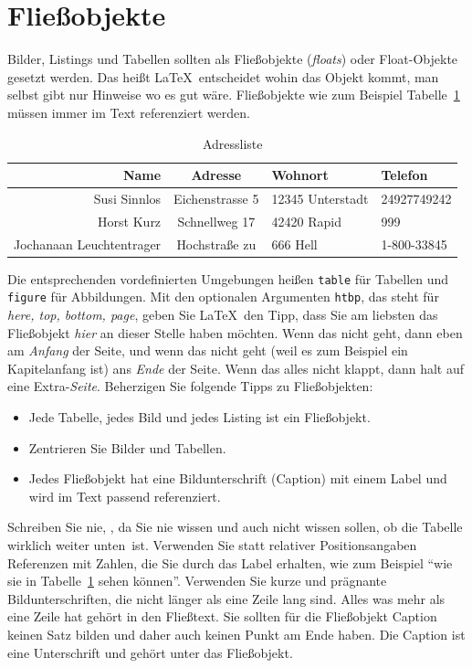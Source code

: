 \documentclass[11pt,a4paper]{report}
\begin{document}
\section{Fließobjekte}

Bilder, Listings und Tabellen sollten als Fließobjekte (\emph{floats}) 
oder Float-Objekte gesetzt werden.
Das heißt \LaTeX\ entscheidet wohin das Objekt kommt, man selbst
gibt nur Hinweise wo es gut wäre.
Fließobjekte wie zum Beispiel Tabelle~\ref{tab:meinetab} müssen immer im 
Text referenziert werden.

\begin{table}[htbp] %
\centering
\begin{tabular}{|r|c|l|l|}
\hline
\textbf{Name} & \textbf{Adresse} & \textbf{Wohnort} & \textbf{Telefon} \\ 
\hline\hline
Susi Sinnlos & Eichenstrasse 5 & 12345 Unterstadt & 24927749242 \\
Horst Kurz & Schnellweg 17 & 42420 Rapid & 999 \\\hline
Jochanaan Leuchtentrager & Hochstraße zu & 666 Hell & 1-800-33845\\\hline
\end{tabular}
\caption{Adressliste}
\label{tab:meinetab}
\end{table}

Die entsprechenden vordefinierten Umgebungen heißen 
\verb|table| für Tabellen und \verb|figure| für Abbildungen. 
Mit den optionalen Argumenten \verb|htbp|, das steht für
\textit{here, top, bottom, page}, geben Sie \LaTeX\ den 
Tipp, dass Sie am liebsten das Fließobjekt \textit{hier}
an dieser Stelle haben möchten. Wenn das nicht geht, dann
eben am \textit{Anfang} der Seite, und wenn das nicht geht (weil es
zum Beispiel ein Kapitelanfang ist) ans \textit{Ende} der Seite. 
Wenn das alles nicht klappt, dann halt auf eine Extra-\textit{Seite}.
Beherzigen Sie folgende Tipps zu Fließobjekten:
\begin{itemize}
\item Jede Tabelle, jedes Bild und jedes Listing ist ein Fließobjekt.
\item Zentrieren Sie Bilder und Tabellen.
\item Jedes Fließobjekt hat eine Bildunterschrift (Caption) mit
  einem Label und wird im Text passend referenziert.
\end{itemize}
Schreiben Sie nie, ,
da Sie nie wissen und auch nicht wissen sollen, ob die Tabelle 
wirklich \glqq weiter unten\grqq\ ist. 
Verwenden Sie statt relativer Positionsangaben Referenzen mit Zahlen,
die Sie durch das Label erhalten, wie zum Beispiel 
"`wie sie in Tabelle~\ref{tab:meinetab} sehen können"'.
Verwenden Sie kurze und prägnante Bildunterschriften, die 
nicht länger als eine Zeile lang sind. 
Alles was mehr als eine Zeile hat gehört in den Fließtext.
Sie sollten für die Fließobjekt Caption keinen Satz bilden und 
daher auch keinen Punkt am Ende haben.
Die Caption ist eine Unterschrift und gehört unter das Fließobjekt.
\end{document}
